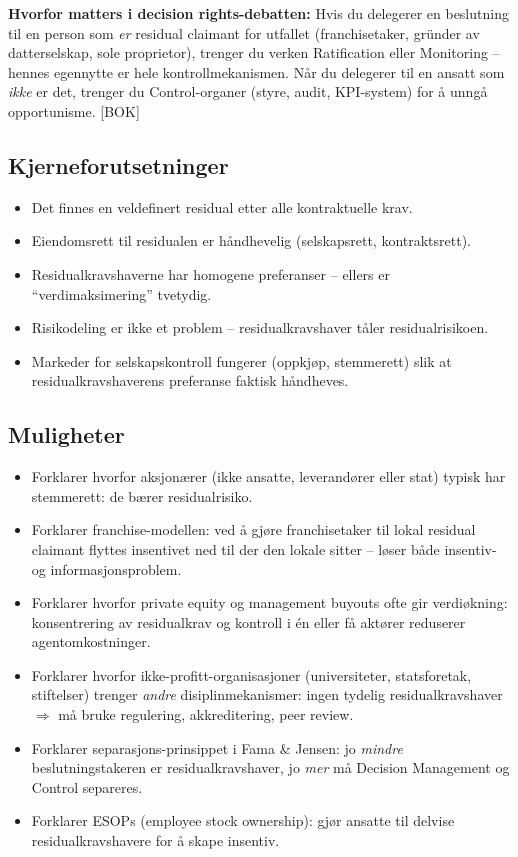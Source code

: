 \textbf{Hvorfor matters i decision rights-debatten:} Hvis du delegerer en beslutning til en person som \emph{er} residual claimant for utfallet (franchisetaker, gründer av datterselskap, sole proprietor), trenger du verken Ratification eller Monitoring -- hennes egennytte er hele kontrollmekanismen. Når du delegerer til en ansatt som \emph{ikke} er det, trenger du Control-organer (styre, audit, KPI-system) for å unngå opportunisme. [BOK]

\subsection*{Kjerneforutsetninger}
\begin{itemize}
\item Det finnes en veldefinert residual etter alle kontraktuelle krav.
\item Eiendomsrett til residualen er håndhevelig (selskapsrett, kontraktsrett).
\item Residualkravshaverne har homogene preferanser -- ellers er ``verdimaksimering'' tvetydig.
\item Risikodeling er ikke et problem -- residualkravshaver tåler residualrisikoen.
\item Markeder for selskapskontroll fungerer (oppkjøp, stemmerett) slik at residualkravshaverens preferanse faktisk håndheves.
\end{itemize}

\subsection*{Muligheter}
\begin{itemize}
\item Forklarer hvorfor aksjonærer (ikke ansatte, leverandører eller stat) typisk har stemmerett: de bærer residualrisiko.
\item Forklarer franchise-modellen: ved å gjøre franchisetaker til lokal residual claimant flyttes insentivet ned til der den lokale  sitter -- løser både insentiv- og informasjonsproblem.
\item Forklarer hvorfor private equity og management buyouts ofte gir verdiøkning: konsentrering av residualkrav og kontroll i én eller få aktører reduserer agentomkostninger.
\item Forklarer hvorfor ikke-profitt-organisasjoner (universiteter, statsforetak, stiftelser) trenger \emph{andre} disiplinmekanismer: ingen tydelig residualkravshaver $\Rightarrow$ må bruke regulering, akkreditering, peer review.
\item Forklarer separasjons-prinsippet i Fama \& Jensen: jo \emph{mindre} beslutningstakeren er residualkravshaver, jo \emph{mer} må Decision Management og Control separeres.
\item Forklarer ESOPs (employee stock ownership): gjør ansatte til delvise residualkravshavere for å skape insentiv.
\end{itemize}

